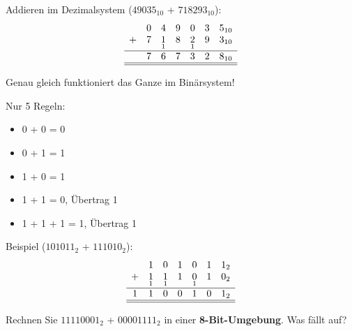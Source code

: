 \renewcommand{\thelektion}{L04 \textperiodcentered{} Rechnen im Binärsystem \& Bits/Bytes}

\begin{frame}\end{frame}

\begin{frame}
Addieren im Dezimalsystem ($49035_{10}$ + $718293_{10}$):
\[
\begin{array}{ccccccc}
  & 0 & 4 & 9 & 0 & 3 & 5_{10} \\
+ & \underset{}{7} & \underset{1}{1} & \underset{}{8} & \underset{1}{2} & \underset{}{9} & \underset{}{3_{10}} \\
\hline
 & 7 & 6 & 7 & 3 & 2 & 8_{10} \\\hline\hline
\end{array}
\]
\begin{center}Genau gleich funktioniert das Ganze im Binärsystem!\end{center}
\end{frame}

\begin{frame}
Nur 5 Regeln:
\begin{itemize}
\item 0 + 0 = 0
\item 0 + 1 = 1
\item 1 + 0 = 1
\item 1 + 1 = 0, Übertrag 1
\item 1 + 1 + 1 = 1, Übertrag 1
\end{itemize}

Beispiel ($101011_2$ + $111010_2$):
\[
\begin{array}{ccccccc}
	& 1 & 0 & 1 & 0 & 1 & 1_2 \\
	+ & \underset{1}{1} & \underset{1}{1} & \underset{}{1} & \underset{1}{0} & \underset{}{1} & \underset{}{0_2} \\
	\hline
	1 & 1 & 0 & 0 & 1 & 0 & 1_2 \\\hline\hline
\end{array}
\]
\end{frame}

\begin{frame}
\begin{center}
Rechnen Sie $11110001_2$ + $00001111_2$ in einer \textbf{8-Bit-Umgebung}. Was fällt auf?
\end{center}
\end{frame}

